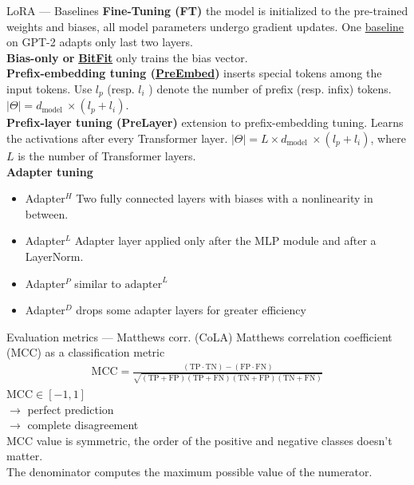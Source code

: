 \documentclass[aspectratio=169,xcolor=dvipsnames]{beamer}
\begin{document}

\begin{frame}[c]{LoRA --- Baselines} 
    \textbf{Fine-Tuning (FT)} the model is initialized to the pre-trained weights and biases, all model parameters undergo gradient updates. One \href{https://arxiv.org/pdf/2101.00190}{baseline} on GPT-2 adapts only last two layers. \\
    \medskip
    \textbf{Bias-only or} \href{https://arxiv.org/abs/2106.10199}{\textbf{BitFit}} only trains the bias vector. \\
    \medskip
    \textbf{Prefix-embedding tuning (\href{https://arxiv.org/abs/2101.00190}{\textbf{PreEmbed}})} inserts special tokens among the input tokens. Use $l_{p}$ (resp. $l_{i}$ ) denote the number of prefix (resp. infix) tokens. $|\Theta|=d_{\text {model }} \times\left(l_{p}+l_{i}\right)$.\\
    \medskip
    \textbf{Prefix-layer tuning (PreLayer)} extension to prefix-embedding tuning. Learns the activations after every Transformer layer. $|\Theta|=L \times d_{\text {model }} \times\left(l_{p}+l_{i}\right)$, where $L$ is the number of Transformer layers.\\
    \medskip
    \textbf{Adapter tuning} 
    \begin{itemize}
        \item Adapter${ }^{H}$ Two fully connected layers with biases with a nonlinearity in between.
        \item Adapter${ }^{L}$ Adapter layer applied only after the MLP module and after a LayerNorm.
        \item Adapter${ }^{P}$ similar to $\text{adapter}^L$
        \item Adapter${ }^{D}$ drops some adapter layers for greater efficiency
    \end{itemize}
\end{frame}


\begin{frame}{Evaluation metrics --- Matthews corr. (CoLA)}
    Matthews correlation coefficient (MCC) as a classification metric
    \bigskip
    \begin{align*}
        \mathrm{MCC}=\frac{(\mathrm{TP} \cdot \mathrm{TN})-(\mathrm{FP} \cdot \mathrm{FN})}{\sqrt{(\mathrm{TP}+\mathrm{FP})(\mathrm{TP}+\mathrm{FN})(\mathrm{TN}+\mathrm{FP})(\mathrm{TN}+\mathrm{FN})}}
    \end{align*}
    $\text{MCC} \in [-1, 1]$\\
     $\rightarrow$ perfect prediction\\
     $\rightarrow$ complete disagreement\\
    \medskip
    MCC value is symmetric, the order of the positive and negative classes doesn't matter. \\
    \medskip
    The denominator computes the maximum possible value of the numerator.
\end{frame}
\end{document}
